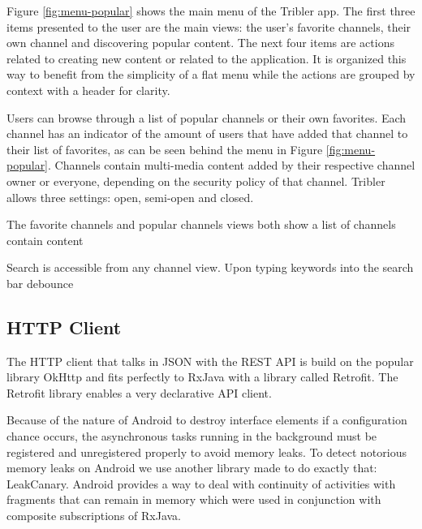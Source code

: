 
Figure \ref{fig:menu-popular} shows the main menu of the Tribler app.
The first three items presented to the user are the main views: the user's favorite channels, their own channel and discovering popular content.
The next four items are actions related to creating new content or related to the application.
It is organized this way to benefit from the simplicity of a flat menu while the actions are grouped by context with a header for clarity.

Users can browse through a list of popular channels or their own favorites.
Each channel has an indicator of the amount of users that have added that channel to their list of favorites, as can be seen behind the menu in Figure \ref{fig:menu-popular}.
Channels contain multi-media content added by their respective channel owner or everyone, depending on the security policy of that channel.
Tribler allows three settings: open, semi-open and closed.


The favorite channels and popular channels views both show a list of channels  contain content

Search is accessible from any channel view.
Upon typing keywords into the search bar
debounce



\subsection{HTTP Client}
The HTTP client that talks in JSON with the REST API is build on the popular library OkHttp and fits perfectly to RxJava with a library called Retrofit.
The Retrofit library enables a very declarative API client.

Because of the nature of Android to destroy interface elements if a configuration chance occurs, the asynchronous tasks running in the background must be registered and unregistered properly to avoid memory leaks.
To detect notorious memory leaks on Android we use another library made to do exactly that: LeakCanary.
Android provides a way to deal with continuity of activities with fragments that can remain in memory which were used in conjunction with composite subscriptions of RxJava.

